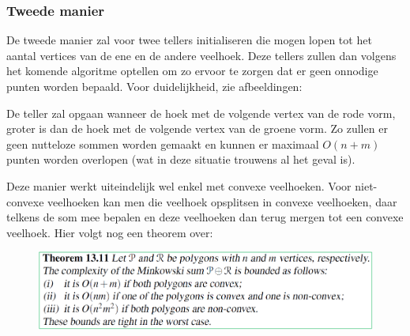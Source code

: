 \documentclass[12pt,a4paper]{article}
\begin{document}
	\subsubsection*{Tweede manier}
	De tweede manier zal voor twee tellers initialiseren die mogen lopen tot het aantal vertices van de ene en de andere veelhoek. Deze tellers zullen dan volgens het komende algoritme optellen om zo ervoor te zorgen dat er geen onnodige punten worden bepaald. Voor duidelijkheid, zie afbeeldingen: 
	\begin{figure}[H]
		\centering
		\label{fig:minkowskiSum}
	\end{figure}
	
	De teller zal opgaan wanneer de hoek met de volgende vertex van de rode vorm, groter is dan de hoek met de volgende vertex van de groene vorm. Zo zullen er geen nutteloze sommen worden gemaakt en kunnen er maximaal $O(n+m)$ punten worden overlopen (wat in deze situatie trouwens al het geval is). 
	
	Deze manier werkt uiteindelijk wel enkel met convexe veelhoeken. Voor niet-convexe veelhoeken kan men die veelhoek opsplitsen in convexe veelhoeken, daar telkens de som mee bepalen en deze veelhoeken dan terug mergen tot een convexe veelhoek. Hier volgt nog een theorem over: 
	\begin{figure}[H]
		\centering
		\includegraphics[width=0.7\linewidth]{afbeeldingen/Motion-plannine/theoremComplexiteit}
		\label{fig:theoremcomplexiteit}
	\end{figure}
	
\end{document}
